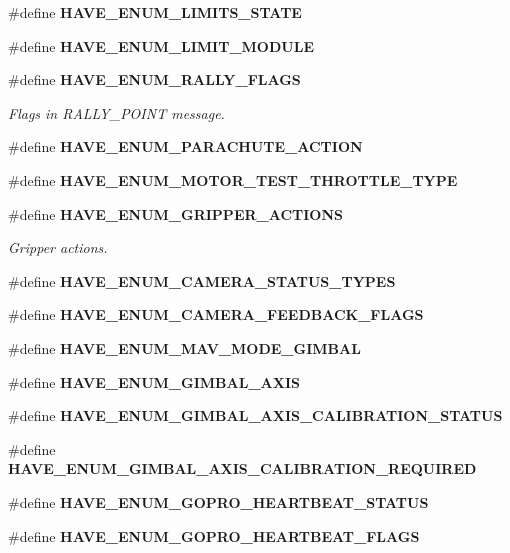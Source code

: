 \begin{DoxyCompactItemize}
\#define \textbf{ H\+A\+V\+E\+\_\+\+E\+N\+U\+M\+\_\+\+L\+I\+M\+I\+T\+S\+\_\+\+S\+T\+A\+TE}
\item 
\#define \textbf{ H\+A\+V\+E\+\_\+\+E\+N\+U\+M\+\_\+\+L\+I\+M\+I\+T\+\_\+\+M\+O\+D\+U\+LE}
\item 
\#define \textbf{ H\+A\+V\+E\+\_\+\+E\+N\+U\+M\+\_\+\+R\+A\+L\+L\+Y\+\_\+\+F\+L\+A\+GS}
\begin{DoxyCompactList}\small\item\em Flags in R\+A\+L\+L\+Y\+\_\+\+P\+O\+I\+NT message. \end{DoxyCompactList}\item 
\#define \textbf{ H\+A\+V\+E\+\_\+\+E\+N\+U\+M\+\_\+\+P\+A\+R\+A\+C\+H\+U\+T\+E\+\_\+\+A\+C\+T\+I\+ON}
\item 
\#define \textbf{ H\+A\+V\+E\+\_\+\+E\+N\+U\+M\+\_\+\+M\+O\+T\+O\+R\+\_\+\+T\+E\+S\+T\+\_\+\+T\+H\+R\+O\+T\+T\+L\+E\+\_\+\+T\+Y\+PE}
\item 
\#define \textbf{ H\+A\+V\+E\+\_\+\+E\+N\+U\+M\+\_\+\+G\+R\+I\+P\+P\+E\+R\+\_\+\+A\+C\+T\+I\+O\+NS}
\begin{DoxyCompactList}\small\item\em Gripper actions. \end{DoxyCompactList}\item 
\#define \textbf{ H\+A\+V\+E\+\_\+\+E\+N\+U\+M\+\_\+\+C\+A\+M\+E\+R\+A\+\_\+\+S\+T\+A\+T\+U\+S\+\_\+\+T\+Y\+P\+ES}
\item 
\#define \textbf{ H\+A\+V\+E\+\_\+\+E\+N\+U\+M\+\_\+\+C\+A\+M\+E\+R\+A\+\_\+\+F\+E\+E\+D\+B\+A\+C\+K\+\_\+\+F\+L\+A\+GS}
\item 
\#define \textbf{ H\+A\+V\+E\+\_\+\+E\+N\+U\+M\+\_\+\+M\+A\+V\+\_\+\+M\+O\+D\+E\+\_\+\+G\+I\+M\+B\+AL}
\item 
\#define \textbf{ H\+A\+V\+E\+\_\+\+E\+N\+U\+M\+\_\+\+G\+I\+M\+B\+A\+L\+\_\+\+A\+X\+IS}
\item 
\#define \textbf{ H\+A\+V\+E\+\_\+\+E\+N\+U\+M\+\_\+\+G\+I\+M\+B\+A\+L\+\_\+\+A\+X\+I\+S\+\_\+\+C\+A\+L\+I\+B\+R\+A\+T\+I\+O\+N\+\_\+\+S\+T\+A\+T\+US}
\item 
\#define \textbf{ H\+A\+V\+E\+\_\+\+E\+N\+U\+M\+\_\+\+G\+I\+M\+B\+A\+L\+\_\+\+A\+X\+I\+S\+\_\+\+C\+A\+L\+I\+B\+R\+A\+T\+I\+O\+N\+\_\+\+R\+E\+Q\+U\+I\+R\+ED}
\item 
\#define \textbf{ H\+A\+V\+E\+\_\+\+E\+N\+U\+M\+\_\+\+G\+O\+P\+R\+O\+\_\+\+H\+E\+A\+R\+T\+B\+E\+A\+T\+\_\+\+S\+T\+A\+T\+US}
\item 
\#define \textbf{ H\+A\+V\+E\+\_\+\+E\+N\+U\+M\+\_\+\+G\+O\+P\+R\+O\+\_\+\+H\+E\+A\+R\+T\+B\+E\+A\+T\+\_\+\+F\+L\+A\+GS}

\end{DoxyCompactItemize}

